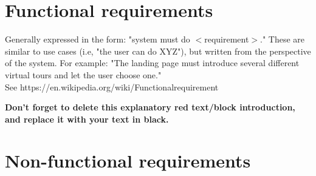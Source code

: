 \pagebreak

\section{Functional requirements} %

\begin{tcolorbox}[      %
    boxrule=0pt,        %
    colback=white,      %
    coltext=red         %
]                       %
    Generally expressed in the form: "system must do $<$requirement$>$." These are similar to use cases (i.e, "the user can do XYZ"), but written from the perspective of the system. For example: "The landing page must introduce several different virtual tours and let the user choose one." \\
    See https://en.wikipedia.org/wiki/Functional\textunderscore requirement
    
    \vspace{15pt}       %
    \begin{center}      %
    \textbf{Don't forget to delete this explanatory red text/block introduction, and replace it with your text in black.}
    \end{center}        %
\end{tcolorbox}         %

\section{Non-functional requirements} %

